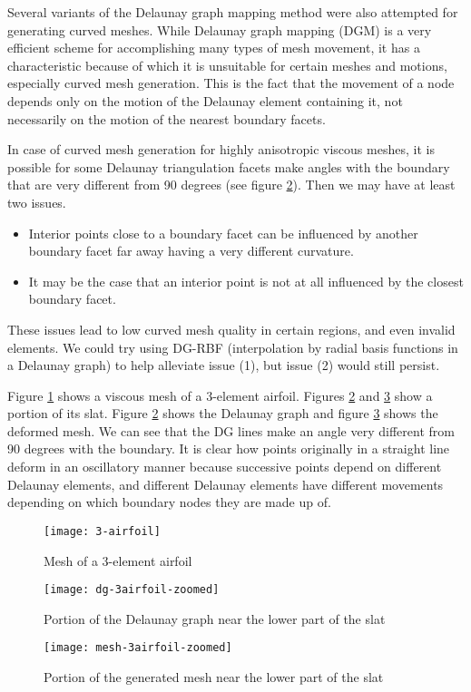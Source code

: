 Several variants of the Delaunay graph mapping method were also attempted for generating curved meshes. While Delaunay graph mapping (DGM) is a very efficient scheme for accomplishing many types of mesh movement, it has a characteristic because of which it is unsuitable for certain meshes and motions, especially curved mesh generation. This is the fact that the movement of a node depends only on the motion of the Delaunay element containing it, not necessarily on the motion of the nearest boundary facets.

In case of curved mesh generation for highly anisotropic viscous meshes, it is possible for some Delaunay triangulation facets make angles with the boundary that are very different from 90 degrees (see figure \ref{fig:wmesh-dg}). Then we may have at least two issues.
\begin{itemize}
	\item[1.] Interior points close to a boundary facet can be influenced by another boundary facet far away having a very different curvature.
	\item[2.] It may be the case that an interior point is not at all influenced by the closest boundary facet.
\end{itemize}
These issues lead to low curved mesh quality in certain regions, and even invalid elements. We could try using DG-RBF (interpolation by radial basis functions in a Delaunay graph) to help alleviate issue (1), but issue (2) would still persist.

Figure \ref{fig:wmesh} shows a viscous mesh of a 3-element airfoil. Figures \ref{fig:wmesh-dg} and \ref{fig:wmesh-zoomed} show a portion of its slat. Figure \ref{fig:wmesh-dg} shows the Delaunay graph and figure \ref{fig:wmesh-zoomed} shows the deformed mesh. We can see that the DG lines make an angle very different from 90 degrees with the boundary. It is clear how points originally in a straight line deform in an oscillatory manner because successive points depend on different Delaunay elements, and different Delaunay elements have different movements depending on which boundary nodes they are made up of.

\begin{figure}
	\centering
	\texttt{[image: 3-airfoil]}
	\caption{Mesh of a 3-element airfoil}
	\label{fig:wmesh}
\end{figure}
\begin{figure}
	\centering
	\texttt{[image: dg-3airfoil-zoomed]}
	\caption{Portion of the Delaunay graph near the lower part of the slat}
	\label{fig:wmesh-dg}
\end{figure}
\begin{figure}
	\centering
	\texttt{[image: mesh-3airfoil-zoomed]}
	\caption{Portion of the generated mesh near the lower part of the slat}
	\label{fig:wmesh-zoomed}
\end{figure}

